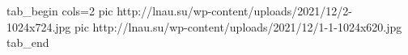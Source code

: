  
 
 
 
 

\ifcmt
  tab_begin cols=2
     pic http://lnau.su/wp-content/uploads/2021/12/2-1024x724.jpg
     pic http://lnau.su/wp-content/uploads/2021/12/1-1-1024x620.jpg
  tab_end
\fi
